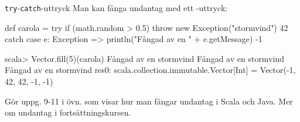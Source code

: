 

\begin{Slide}{\texttt{try}-\texttt{catch}-uttryck}\SlideFontSmall
Man kan fånga undantag med ett -uttryck:
\begin{Code}
def carola = try {
  if (math.random > 0.5) throw new Exception("stormvind")
  42
} catch {
  case e: Exception =>
    println("Fångad av en " + e.getMessage)
    -1
}
\end{Code}
\pause
\begin{REPL}
scala> Vector.fill(5)(carola)
Fångad av en stormvind
Fångad av en stormvind
Fångad av en stormvind
res0: scala.collection.immutable.Vector[Int] = Vector(-1, 42, 42, -1, -1)
\end{REPL}
Gör uppg. 9-11 i övn.  som visar hur man fångar undantag i Scala och Java. Mer om undantag i fortsättningskursen.
\end{Slide}
